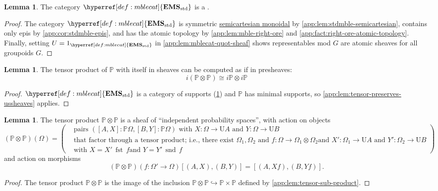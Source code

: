 \documentclass[
  sigconf,
  screen, ]{acmart}
\theoremstyle{definition}
\newtheorem{lemma}[theorem]{Lemma}
\newcommand\nref[2]{\hyperref[#1]{#2}} \newcommand\checkhigh{{\huge{\color{red}\textbf{TODO: check}}}}
\newcommand\scmfst{\mathop{\nref{app:def:semicartesian-monoidal-category}{\mathrm{fst}}}}
\newcommand\scmsnd{\mathop{\nref{app:def:semicartesian-monoidal-category}{\mathrm{snd}}}}
\newcommand\shotimes{\mathop{\otimes}}
\newcommand\texforgetmu{\mathrm{U}}
\newcommand\forgetmu{{\nref{def:forgetmu}{\texforgetmu}}}
\newcommand\texStdMble{\mathbf{EMS}_{\rm std}}
\newcommand\StdMble{{\nref{def:mblecat}{\texStdMble}}}
\newcommand\texpspcs{\mathbb P}
\newcommand\pspcs{{\nref{def:mble-pspcs}{\texpspcs}}}
\begin{document}
\begin{lemma} \label{app:lem:stdmble-supports}
  The category $\StdMble$ is a .
\end{lemma}
\begin{proof}
  The category $\StdMble$ is symmetric \nref{app:def:semicartesian-monoidal-category}{semicartesian monoidal} by
  \cref{app:lem:stdmble-semicartesian},
  contains only epis by \cref{app:cor:stdmble-epis},
  and has the atomic topology by \cref{app:lem:mble-right-ore} 
  and \cref{app:fact:right-ore-atomic-topology}.
  Finally, setting $U=1_\StdMble$ in \cref{app:lem:mblecat-quot-sheaf} shows representables mod $G$
  are atomic sheaves for all groupoids $G$.
\end{proof}

\begin{lemma} \label{app:lem:mble-pspcs-tensor-pspcs}
  The tensor product of $\nref{app:def:mble-pspcs}\pspcs$ with itself in sheaves can be computed as if in presheaves:
  \[ i(\pspcs\nref{app:def:tensor-product-of-sheaves}{\shotimes} \pspcs) \cong i\pspcs\otimes i\pspcs\]
\end{lemma}
\begin{proof}
  $\StdMble$ is a category of supports (\cref{app:lem:stdmble-supports})
  and $\pspcs$ has minimal supports,
  so \cref{app:lem:tensor-preserves-ussheaves} applies.
\end{proof}

\begin{lemma} \label{app:lem:pspcs-day-conv-char}
  The tensor product $\pspcs\nref{app:def:mble-pspcs}\shotimes\pspcs$
  is a sheaf of ``independent probability spaces'', with action on objects
  \[ (\pspcs\shotimes\pspcs)(\Omega)
     = \left(\begin{aligned}
      &\text{pairs $([A,X]:\pspcs\Omega,[B,Y]:\pspcs\Omega)$ with $X:\Omega\to \forgetmu A$ and $Y:\Omega\to \forgetmu B$} \\
      &\text{that factor through a tensor product; i.e.,
        there exist $\Omega_1,\Omega_2$ and $f : \Omega\to\Omega_1\otimes\Omega_2$
        and $X' : \Omega_1\to \forgetmu A$ and $Y':\Omega_2\to \forgetmu B$} \\
      &\text{with $X = X'\,\scmfst \,f$
      and $Y = Y'\,\scmsnd \,f$}
     \end{aligned}\right)\]
  and action on morphisms
  \[ (\pspcs\shotimes\pspcs)(f: \Omega'\to\Omega)[(A,X),(B,Y)]
     = [(A,Xf),(B,Yf)].
  \]
\end{lemma}
\begin{proof}
  The tensor product $\pspcs\shotimes\pspcs$
  is the image of the inclusion $\pspcs\shotimes\pspcs\hookrightarrow\pspcs\times\pspcs$
  defined by \cref{app:lem:tensor-sub-product}.
\end{proof}
\end{document}
